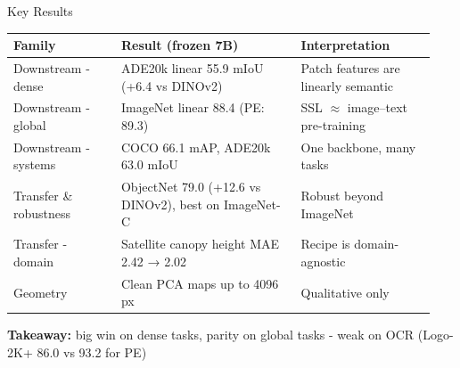 \begin{frame}{Key Results}
    \begin{table}
        \centering
        \footnotesize
        \begin{tabular}{>{\raggedright\arraybackslash}p{0.24\linewidth} >{\raggedright\arraybackslash}p{0.40\linewidth} >{\raggedright\arraybackslash}p{0.30\linewidth}}
            \toprule[1.5pt]
            \textbf{Family} & \textbf{Result (frozen 7B)} & \textbf{Interpretation} \\
            \midrule[1.5pt]
            Downstream - dense & ADE20k linear 55.9 mIoU (+6.4 vs DINOv2) & Patch features are linearly semantic \\
            \midrule
            Downstream - global &  ImageNet linear 88.4 (PE: 89.3) &  SSL $\approx$ image--text pre-training \\ 
            \midrule
            Downstream - systems &  COCO 66.1 mAP, ADE20k 63.0 mIoU &  One backbone, many tasks \\ 
            \midrule
            Transfer \& robustness &  ObjectNet 79.0 (+12.6 vs DINOv2), best on ImageNet-C &  Robust beyond ImageNet \\ 
            \midrule
            Transfer - domain &  Satellite canopy height MAE 2.42 → 2.02 &  Recipe is domain-agnostic \\ 
            \midrule
            Geometry &  Clean PCA maps up to 4096 px &  Qualitative only \\
            \bottomrule[1.5pt]
        \end{tabular}
    \end{table}
    \vspace{5px}
    \textbf{Takeaway:} big win on dense tasks, parity on global tasks - weak on OCR (Logo-2K+ 86.0 vs 93.2 for PE)
\end{frame}
